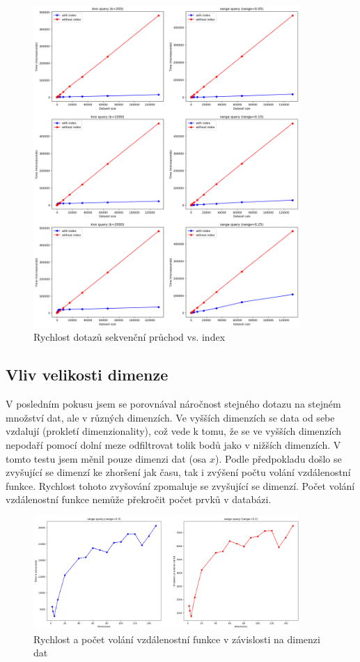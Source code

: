 \documentclass{article}
\begin{document}
\begin{figure}[H]
    \centering
    \includegraphics[width=0.9\textwidth]{with_index-without_index.png}
    \caption{Rychlost dotazů sekvenční průchod vs. index}
\end{figure}

\subsection{Vliv velikosti dimenze}

V posledním pokusu jsem se porovnával náročnost stejného dotazu na stejném množství dat, ale v různých dimenzích. Ve vyšších dimenzích se data od sebe vzdalují (prokletí dimenzionality), což vede k tomu, že se ve vyšších dimenzích nepodaří pomocí dolní meze odfiltrovat tolik bodů jako v nižších dimenzích. V tomto testu jsem měnil pouze dimenzi dat (osa $x$). Podle předpokladu došlo se zvyšující se dimenzí ke zhoršení jak času, tak i zvýšení počtu volání vzdálenostní funkce. Rychlost tohoto zvyšování zpomaluje se zvyšující se dimenzí. Počet volání vzdálenostní funkce nemůže překročit počet prvků v databázi.

\begin{figure}[H]
    \centering
    \includegraphics[width=0.9\textwidth]{dimensions.png}
    \caption{Rychlost a počet volání vzdálenostní funkce v závislosti na dimenzi dat}
\end{figure}
\end{document}
